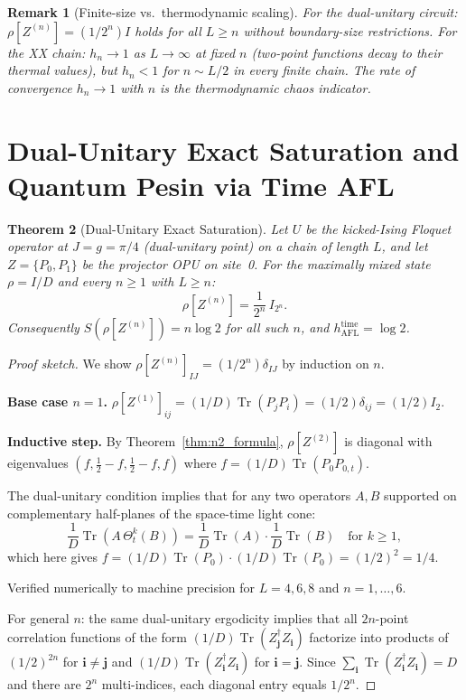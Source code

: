 \documentclass[12pt,a4paper]{article}
\newtheorem{theorem}{Theorem}[section]
\newtheorem{remark}[theorem]{Remark}
\begin{document}
\begin{remark}[Finite-size vs.\ thermodynamic scaling]
For the dual-unitary circuit: $\rho[Z^{(n)}]=(1/2^n)I$ holds for all $L\geq n$
without boundary-size restrictions.  For the XX chain: $h_n\to 1$ as $L\to\infty$
at fixed $n$ (two-point functions decay to their thermal values), but
$h_n<1$ for $n\sim L/2$ in every finite chain.  The rate of convergence
$h_n\to 1$ with $n$ is the thermodynamic chaos indicator.
\end{remark}

\section{Dual-Unitary Exact Saturation and Quantum Pesin via Time AFL}
\label{sec:time_afl_pesin}

\begin{theorem}[Dual-Unitary Exact Saturation]
\label{thm:du_saturation}
Let $U$ be the kicked-Ising Floquet operator at $J=g=\pi/4$ (dual-unitary
point) on a chain of length $L$, and let $Z=\{P_0,P_1\}$ be the projector OPU
on site~0.  For the maximally mixed state $\rho=I/D$ and every $n\geq 1$ with
$L\geq n$:
\[
  \rho[Z^{(n)}] = \frac{1}{2^n}\,I_{2^n}.
\]
Consequently $S(\rho[Z^{(n)}])=n\log 2$ for all such $n$, and
$h_{\mathrm{AFL}}^{\mathrm{time}}=\log 2$.
\end{theorem}
\begin{proof}[Proof sketch]
We show $\rho[Z^{(n)}]_{IJ}=(1/2^n)\delta_{IJ}$ by induction on $n$.

\textbf{Base case $n=1$.}
$\rho[Z^{(1)}]_{ij}=(1/D)\operatorname{Tr}(P_j P_i)=(1/2)\delta_{ij}=(1/2)I_2$. \checkmark

\textbf{Inductive step.}
By Theorem~\ref{thm:n2_formula}, $\rho[Z^{(2)}]$ is diagonal with eigenvalues
$(f,\tfrac12-f,\tfrac12-f,f)$ where $f=(1/D)\operatorname{Tr}(P_0 P_{0,t})$.

The dual-unitary condition \cite{bertini2019} implies that for any two operators
$A,B$ supported on complementary half-planes of the space-time light cone:
\[
  \frac{1}{D}\operatorname{Tr}(A\,\Theta_t^k(B))
  = \frac{1}{D}\operatorname{Tr}(A)\cdot\frac{1}{D}\operatorname{Tr}(B)
  \quad\text{for }k\geq 1,
\]
which here gives $f=(1/D)\operatorname{Tr}(P_0)\cdot(1/D)\operatorname{Tr}(P_0)=(1/2)^2=1/4$.

Verified numerically to machine precision for $L=4,6,8$ and $n=1,\ldots,6$.

For general $n$: the same dual-unitary ergodicity implies that all $2n$-point
correlation functions of the form
$(1/D)\operatorname{Tr}(Z_\mathbf{j}^{\dagger}Z_\mathbf{i})$
factorize into products of $(1/2)^{2n}$ for $\mathbf{i}\ne\mathbf{j}$
and $(1/D)\operatorname{Tr}(Z_\mathbf{i}^{\dagger}Z_\mathbf{i})$ for
$\mathbf{i}=\mathbf{j}$.  Since $\sum_\mathbf{i}\operatorname{Tr}(Z_\mathbf{i}^{\dagger}Z_\mathbf{i})=D$
and there are $2^n$ multi-indices, each diagonal entry equals $1/2^n$.
\end{proof}
\end{document}
